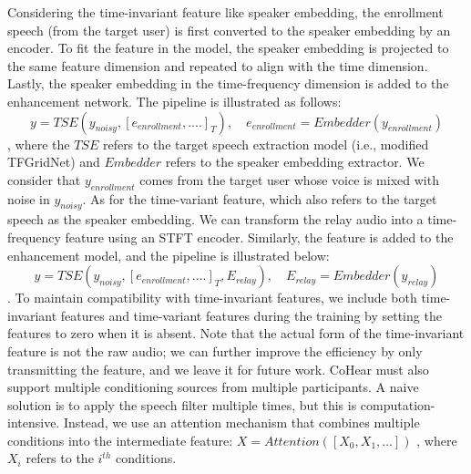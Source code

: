 Considering the time-invariant feature like speaker embedding, the enrollment speech (from the target user) is first converted to the speaker embedding by an encoder. To fit the feature in the model, the speaker embedding is projected to the same feature dimension and repeated to align with the time dimension. Lastly, the speaker embedding in the time-frequency dimension is added to the enhancement network. The pipeline is illustrated as follows:
\[
y = TSE(y_{noisy}, [e_{enrollment}, ....]_{T}), \quad e_{enrollment} = Embedder(y_{enrollment})
\], where the $TSE$ refers to the target speech extraction model (i.e., modified TFGridNet) and $Embedder$ refers to the speaker embedding extractor. We consider that $y_{enrollment}$ comes from the target user whose voice is mixed with noise in $y_{noisy}$.
As for the time-variant feature, which also refers to the target speech as the speaker embedding. We can transform the relay audio into a time-frequency feature using an STFT encoder. Similarly, the feature is added to the enhancement model, and the pipeline is illustrated below:
\[
y = TSE(y_{noisy}, [e_{enrollment}, ....]_{T}, E_{relay}), \quad E_{relay} = Embedder(y_{relay})
\]. To maintain compatibility with time-invariant features, we include both time-invariant features and time-variant features during the training by setting the features to zero when it is absent. Note that the actual form of the time-invariant feature is not the raw audio; we can further improve the efficiency by only transmitting the feature, and we leave it for future work. 
CoHear must also support multiple conditioning sources from multiple participants. A naive solution is to apply the speech filter multiple times, but this is computation-intensive. Instead, we use an attention mechanism that combines multiple conditions into the intermediate feature:
\(
 X = Attention([X_0, X_1, ...])
\)
, where \(X_i\) refers to the \(i^{th}\) conditions.







